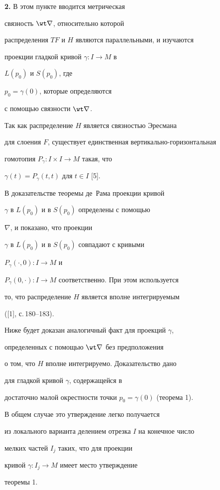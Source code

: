 {\bf 2.} В этом пункте вводится метрическая 


связность $\wt \nabla$, относительно которой


распределения $TF$ и $H$ являются параллельными, и изучаются 


проекции гладкой кривой $\gamma :I\to M$ в 


$L(p_0)$ и $S(p_0)$, где 


$p_0=\gamma (0)$, которые определяются 


с помощью связности $\wt \nabla$.


Так как распределение $H$ является связностью Эресмана 


для слоения $F$, существует единственная вертикально-горизонтальная 


гомотопия $P_\gamma :I\times I\to M$ такая, что 


$\gamma (t) =P_\gamma (t,t)$ для $t\in I$ [5].


В доказательстве теоремы де~Рама проекции кривой 


$\gamma$ в $L(p_0)$ и в $S(p_0)$ определены с помощью 


$\nabla$, и показано, что проекции 


$\gamma$ в $L(p_0)$ и в $S(p_0)$ совпадают с кривыми 


$P_\gamma (\cdot ,0):I\to M$ и 


$P_\gamma (0,\cdot ):I\to M$ соответственно. При этом используется


то, что распределение $H$ является вполне интегрируемым 


([1], с.\,180--183).


Ниже будет доказан аналогичный факт для проекций $\gamma$, 


определенных с помощью $\wt \nabla$ без предположения 


о том, что $H$ вполне интегрируемо. Доказательство дано 


для гладкой кривой $\gamma$, содержащейся в 


достаточно малой окрестности точки $p_0=\gamma (0)$ (теорема 1). 


В общем случае это утверждение легко получается 


из локального варианта делением отрезка $I$ на конечное число 


мелких частей $I_j$ таких, что для проекции 


кривой $\gamma :I_j\to M$ имеет место утверждение 


теоремы 1.


